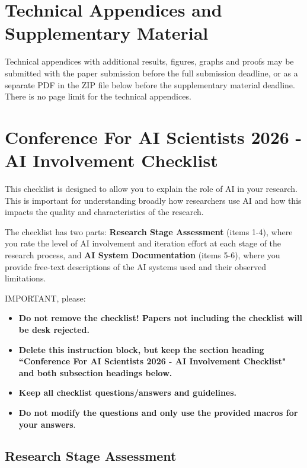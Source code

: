 \documentclass{article}
\begin{document}
\section{Technical Appendices and Supplementary Material}
Technical appendices with additional results, figures, graphs and proofs may be submitted with the paper submission before the full submission deadline, or as a separate PDF in the ZIP file below before the supplementary material deadline. There is no page limit for the technical appendices.

\newpage

\section*{Conference For AI Scientists 2026 - AI Involvement Checklist}
\label{checklist_ai_involvement}

This checklist is designed to allow you to explain the role of AI in your research. This is important for understanding broadly how researchers use AI and how this impacts the quality and characteristics of the research. 

The checklist has two parts: \textbf{Research Stage Assessment} (items 1-4), where you rate the level of AI involvement and iteration effort at each stage of the research process, and \textbf{AI System Documentation} (items 5-6), where you provide free-text descriptions of the AI systems used and their observed limitations.

IMPORTANT, please:
\begin{itemize}
    \item {\bf Do not remove the checklist! Papers not including the checklist will be desk rejected.} 
    \item {\bf Delete this instruction block, but keep the section heading ``Conference For AI Scientists 2026 - AI Involvement Checklist" and both subsection headings below.}
    \item  {\bf Keep all checklist questions/answers and guidelines.}
    \item {\bf Do not modify the questions and only use the provided macros for your answers}.
\end{itemize}

\subsection*{Research Stage Assessment}
\end{document}

